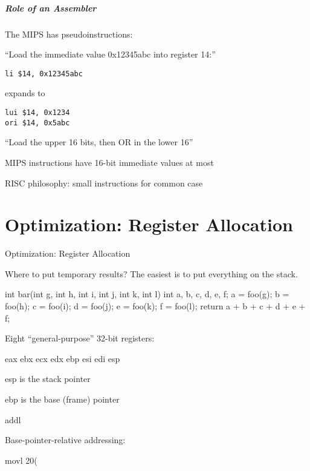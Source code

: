 \documentclass{plt}
\begin{document}
\begin{frame}[fragile]
  \frametitle{Role of an Assembler}

The MIPS has pseudoinstructions:

``Load the immediate value 0x12345abc into register 14:''

\begin{verbatim}
li $14, 0x12345abc
\end{verbatim}

expands to

\begin{verbatim}
lui $14, 0x1234
ori $14, 0x5abc
\end{verbatim}

``Load the upper 16 bits, then OR in the lower 16''

MIPS instructions have 16-bit immediate values at most

RISC philosophy: small instructions for common case

\end{frame}

\part{Optimization: Register Allocation}

\begin{frame}[fragile]{Optimization: Register Allocation}

Where to put temporary results?  The easiest is to put everything on the stack.

\begin{C}
int bar(int g, int h, int i,
        int j, int k, int l)
{
  int a, b, c, d, e, f;
  a = foo(g);
  b = foo(h);
  c = foo(i);
  d = foo(j);
  e = foo(k);
  f = foo(l);
  return a + b + c + d + e + f;
}
\end{C}

\end{frame}

\begin{frame}[fragile]

Eight ``general-purpose'' 32-bit registers:

eax
ebx
ecx
edx
ebp
esi
edi
esp

esp is the stack pointer

ebp is the base (frame) pointer

\begin{semiverbatim}
addl %
\end{semiverbatim}

Base-pointer-relative addressing:

\begin{semiverbatim}
movl 20(%
\end{semiverbatim}



\end{frame}
\end{document}
